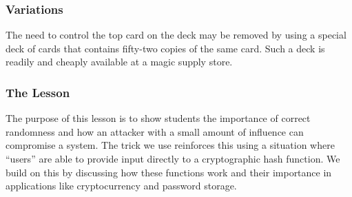 \subsubsection{Variations}

The need to control the top card on the deck may be removed by using a
special deck of cards that contains fifty-two copies of the same card.  Such a
deck is readily and cheaply available at a magic supply store.

\subsubsection{The Lesson}

The purpose of this lesson is to show students the importance of correct
randomness and how an attacker with a small amount of influence can compromise a
system.
The trick we use reinforces this using
a situation where ``users'' are able to provide input
directly to a cryptographic hash function.
We build on this by discussing how these functions work and their importance
in applications like cryptocurrency and password storage.
